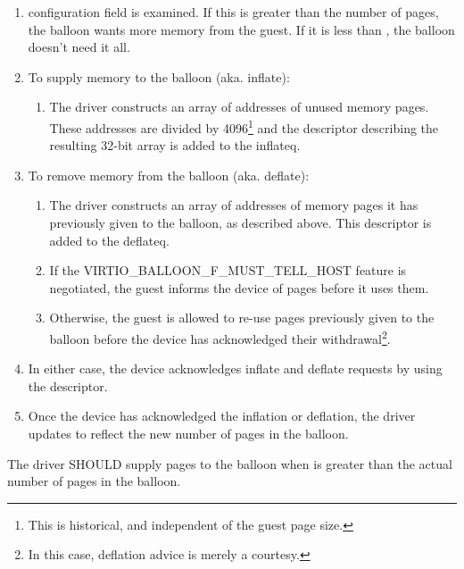 \begin{enumerate}
\item {} configuration field is examined. If this is
  greater than the  number of pages, the balloon wants
  more memory from the guest.  If it is less than ,
  the balloon doesn't need it all.

\item To supply memory to the balloon (aka. inflate):
  \begin{enumerate}
  \item The driver constructs an array of addresses of unused memory
    pages. These addresses are divided by 4096\footnote{This is historical, and independent of the guest page size.
} and the descriptor
    describing the resulting 32-bit array is added to the inflateq.
  \end{enumerate}

\item To remove memory from the balloon (aka. deflate):
  \begin{enumerate}
  \item The driver constructs an array of addresses of memory pages
    it has previously given to the balloon, as described above.
    This descriptor is added to the deflateq.

  \item If the VIRTIO_BALLOON_F_MUST_TELL_HOST feature is negotiated, the
    guest informs the device of pages before it uses them.

  \item Otherwise, the guest is allowed to re-use pages previously
    given to the balloon before the device has acknowledged their
    withdrawal\footnote{In this case, deflation advice is merely a courtesy.
}.
  \end{enumerate}

\item In either case, the device acknowledges inflate and deflate
requests by using the descriptor.
\item Once the device has acknowledged the inflation or
  deflation, the driver updates  to reflect the new number of pages in the balloon.
\end{enumerate}

The driver SHOULD supply pages to the balloon when  is
greater than the actual number of pages in the balloon.

